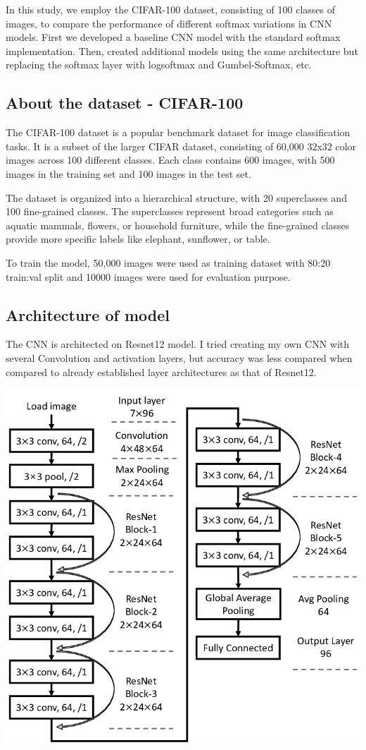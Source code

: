 \documentclass{article}
\begin{document}
In this study, we employ the CIFAR-100 dataset, consisting of 100 classes of images, to compare the performance of different softmax variations in CNN models. First we developed a baseline CNN model with the standard softmax implementation. Then, created additional models using the same architecture but replacing the softmax layer with logsoftmax and Gumbel-Softmax, etc.

\subsection{About the dataset - CIFAR-100}

The CIFAR-100 dataset is a popular benchmark dataset for image classification tasks. It is a subset of the larger CIFAR dataset, consisting of 60,000 32x32 color images across 100 different classes. Each class contains 600 images, with 500 images in the training set and 100 images in the test set.

The dataset is organized into a hierarchical structure, with 20 superclasses and 100 fine-grained classes. The superclasses represent broad categories such as aquatic mammals, flowers, or household furniture, while the fine-grained classes provide more specific labels like elephant, sunflower, or table.

To train the model, 50,000 images were used as training dataset with 80:20 train:val split and 10000 images were used for evaluation purpose.

\subsection{Architecture of model}


The CNN is architected on Resnet12 model. I tried creating my own CNN with several Convolution and activation layers, but accuracy was less compared when compared to already established layer architectures as that of Resnet12.

\includegraphics[scale=0.3]{images/The-structure-of-ResNet-12.png}
\end{document}
